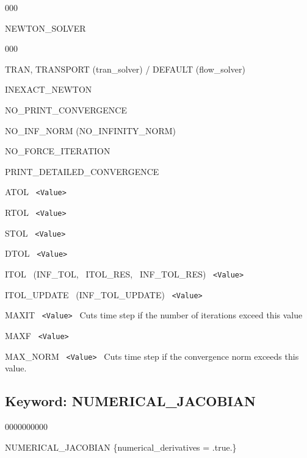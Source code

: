 \documentclass[12pt]{article}
\begin{document}
\begin{deflist}{000}
\item[NEWTON\_SOLVER] ~
\begin{deflist}{000}
\item[TRAN, TRANSPORT (tran\_solver) / DEFAULT (flow\_solver)]
\item[INEXACT\_NEWTON]
\item[NO\_PRINT\_CONVERGENCE]
\item[NO\_INF\_NORM (NO\_INFINITY\_NORM)]
\item[NO\_FORCE\_ITERATION]
\item[PRINT\_DETAILED\_CONVERGENCE]
\item[ATOL] \ {\tt <Value>}
\item[RTOL] \ {\tt <Value>}
\item[STOL] \ {\tt <Value>}
\item[DTOL] \ {\tt <Value>}
\item[ITOL \ (INF\_TOL, \ ITOL\_RES, \ INF\_TOL\_RES)] \ {\tt <Value>}
\item[ITOL\_UPDATE \ (INF\_TOL\_UPDATE)] \ {\tt <Value>}
\item[MAXIT] \ {\tt <Value>} \ Cuts time step if the number of iterations exceed this value
\item[MAXF] \ {\tt <Value>}
\item[MAX\_NORM] \ {\tt <Value>} \ Cuts time step if the convergence norm exceeds this value. 
\end{deflist}
\item[\keyend]
\end{deflist}



\hyperlink{target_key}{\return}


\newpage
\protect\hypertarget{target_numjac}{}

\subsection{Keyword: NUMERICAL\_JACOBIAN}
\begin{deflist}{0000000000}
\item[NUMERICAL\_JACOBIAN] \{numerical\_derivatives = .true.\}
\end{deflist}

\hyperlink{target_key}{\return}
\end{document}
